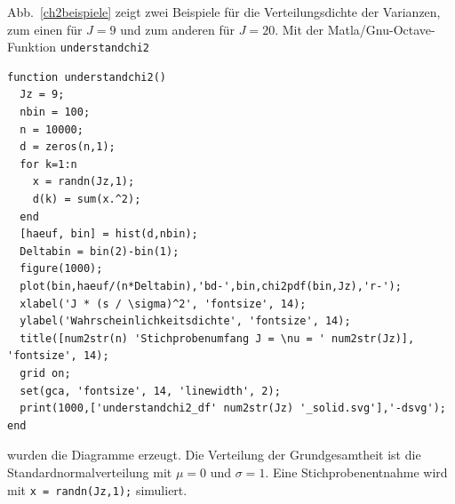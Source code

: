 Abb.~\ref{ch2beispiele} zeigt zwei Beispiele für die Verteilungsdichte der Varianzen, zum einen
für $J = 9$ und zum anderen für $J = 20$. Mit der Matla/Gnu-Octave-Funktion \texttt{understandchi2}
\begin{lstlisting}[style=Matlab]
function understandchi2()
  Jz = 9;
  nbin = 100;
  n = 10000;
  d = zeros(n,1);
  for k=1:n
    x = randn(Jz,1);
    d(k) = sum(x.^2);
  end
  [haeuf, bin] = hist(d,nbin);
  Deltabin = bin(2)-bin(1);
  figure(1000);
  plot(bin,haeuf/(n*Deltabin),'bd-',bin,chi2pdf(bin,Jz),'r-');
  xlabel('J * (s / \sigma)^2', 'fontsize', 14);
  ylabel('Wahrscheinlichkeitsdichte', 'fontsize', 14);
  title([num2str(n) 'Stichprobenumfang J = \nu = ' num2str(Jz)], 'fontsize', 14);
  grid on;
  set(gca, 'fontsize', 14, 'linewidth', 2);
  print(1000,['understandchi2_df' num2str(Jz) '_solid.svg'],'-dsvg');
end
\end{lstlisting}
wurden die Diagramme erzeugt. Die Verteilung der Grundgesamtheit ist die
Standardnormalverteilung mit $\mu = 0$ und $\sigma = 1$.
Eine Stichprobenentnahme wird mit \texttt{x = randn(Jz,1);} simuliert.


